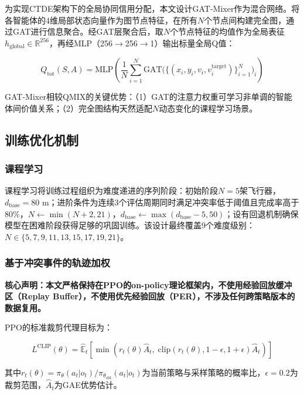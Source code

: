 \documentclass[12pt,a4paper,UTF8]{ctexart}
\begin{document}
为实现CTDE架构下的全局协同信用分配，本文设计GAT-Mixer作为混合网络。将各智能体的4维局部状态向量作为图节点特征，在所有$N$个节点间构建完全图，通过GAT进行信息聚合。经GAT层聚合后，取$N$个节点特征的均值作为全局表征$h_{\text{global}} \in \mathbb{R}^{256}$，再经MLP（256$\to$256$\to$1）输出标量全局Q值：

\begin{equation}
    Q_{\text{tot}}(S, A) = \text{MLP}\left(\frac{1}{N}\sum_{i=1}^{N} \text{GAT}\big(\{(x_i, y_i, v_i, v_i^{\text{target}})\}_{i=1}^{N}\big)_i\right)
\end{equation}

GAT-Mixer相较QMIX的关键优势：（1）GAT的注意力权重可学习非单调的智能体间价值关系；（2）完全图结构天然适配$N$动态变化的课程学习场景。

\subsection{训练优化机制}

\subsubsection{课程学习}

课程学习将训练过程组织为难度递进的序列阶段：初始阶段$N=5$架飞行器，$d_{\text{base}}=80$ m；进阶条件为连续3个评估周期同时满足冲突率低于阈值且完成率高于80\%，$N \leftarrow \min(N+2, 21)$，$d_{\text{base}} \leftarrow \max(d_{\text{base}}-5, 50)$；设有回退机制确保模型在困难阶段获得足够的巩固训练。该设计最终覆盖9个难度级别：$N \in \{5, 7, 9, 11, 13, 15, 17, 19, 21\}$。

\subsubsection{基于冲突事件的轨迹加权}

\textbf{核心声明：本文严格保持在PPO的on-policy理论框架内，不使用经验回放缓冲区（Replay Buffer），不使用优先经验回放（PER），不涉及任何跨策略版本的数据复用。}

PPO的标准裁剪代理目标为：

\begin{equation}
    L^{\text{CLIP}}(\theta) = \hat{\mathbb{E}}_t\left[\min\left(r_t(\theta)\hat{A}_t,\; \text{clip}(r_t(\theta), 1-\epsilon, 1+\epsilon)\hat{A}_t\right)\right]
\end{equation}

其中$r_t(\theta) = \pi_\theta(a_t|o_t) / \pi_{\theta_{\text{old}}}(a_t|o_t)$为当前策略与采样策略的概率比，$\epsilon = 0.2$为裁剪范围，$\hat{A}_t$为GAE优势估计。
\end{document}
